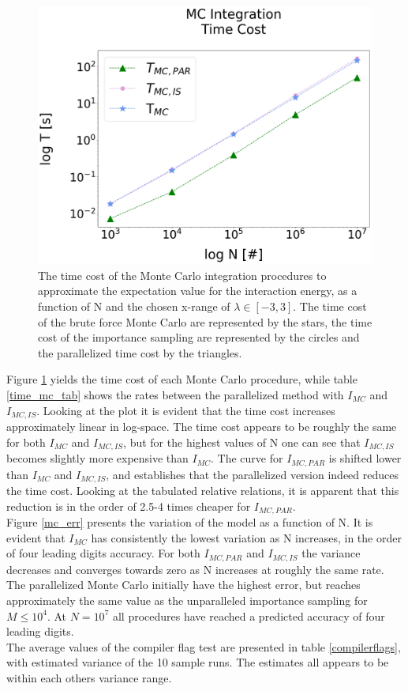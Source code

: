 \documentclass[%
reprint,nofootinbib,
amsmath,amssymb,
aps,
]{revtex4-1}
\begin{document}
\begin{figure}[H]
	\vspace{34.3mm}
\includegraphics[width=\columnwidth]{MC_time.png}
\caption{\label{mc_time} The time cost of the Monte Carlo integration procedures to approximate the expectation value for the interaction energy, as a function of N and the chosen x-range of $\lambda \in[-3,3]$. The time cost of the brute force Monte Carlo are represented by the stars, the time cost of the importance sampling are represented by the circles and the parallelized time cost by the triangles.}
\end{figure} \newpage \noindent 
Figure \ref{mc_time} yields the time cost of each Monte Carlo procedure, while table \ref{time_mc_tab} shows the rates between the parallelized method with $I_{MC}$ and $I_{MC,IS}$. Looking at the plot it is evident that the time cost increases approximately linear in log-space. The time cost appears to be roughly the same for both $I_{MC}$ and $I_{MC,IS}$, but for the highest values of N one can see that $I_{MC,IS}$ becomes slightly more expensive than $I_{MC}$. The curve for $I_{MC,PAR}$ is shifted lower than $I_{MC}$ and $I_{MC,IS}$, and establishes that the parallelized version indeed reduces the time cost. Looking at the tabulated relative relations, it is apparent that this reduction is in the order of 2.5-4 times cheaper for $I_{MC,PAR}$. \\
Figure \ref{mc_err} presents the variation of the model as a function of N. It is evident that $I_{MC}$ has consistently the lowest variation as N increases, in the order of four leading digits accuracy. For both $I_{MC,PAR}$ and $I_{MC,IS}$ the variance decreases and converges towards zero as N increases at roughly the same rate. The parallelized Monte Carlo initially have the highest error, but reaches approximately the same value as the unparalleled importance sampling for $M \leq 10^4$. At $N=10^7$ all procedures have reached a predicted accuracy of four leading digits. \\ \indent
The average values of the compiler flag test are presented in table \ref{compilerflags}, with estimated variance of the 10 sample runs. The estimates all appears to be within each others variance range. \\
\end{document}
